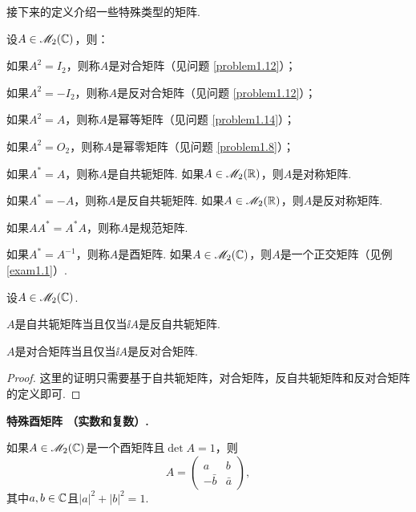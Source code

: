   接下来的定义介绍一些特殊类型的矩阵.
  \begin{definition}
    设$A\in\mathscr M_2(\mathbb C)$，则：
    \begin{enum}
      \item 如果$A^2=I_2$，则称$A$是{\kaishu 对合矩阵}（见问题 \ref{problem1.12}）；
      \item 如果$A^2=-I_2$，则称$A$是{\kaishu 反对合矩阵}（见问题 \ref{problem1.12}）；
      \item 如果$A^2=A$，则称$A$是{\kaishu 幂等矩阵}（见问题 \ref{problem1.14}）；
      \item 如果$A^2=O_2$，则称$A$是{\kaishu 幂零矩阵}（见问题 \ref{problem1.8}）；
      \item 如果$A^\ast=A$，则称$A$是{\kaishu 自共轭矩阵}. 如果$A\in\mathscr M_2(\mathbb R)$，则$A$是对称矩阵.
      \item 如果$A^\ast=-A$，则称$A$是{\kaishu 反自共轭矩阵}. 如果$A\in\mathscr M_2(\mathbb R)$，则$A$是反对称矩阵.
      \item 如果$AA^\ast=A^\ast A$，则称$A$是{\kaishu 规范矩阵}. 
      \item 如果$A^\ast=A^{-1}$，则称$A$是{\kaishu 酉矩阵}. 如果$A\in\mathscr M_2(\mathbb C)$，则$A$是一个正交矩阵（见例 \ref{exam1.1}）.
    \end{enum}
  \end{definition}

  \begin{lemma}
    设$A\in\mathscr M_2(\mathbb C)$.
    \begin{enum}
      \item $A$是自共轭矩阵当且仅当$\ii A$是反自共轭矩阵.
      \item $A$是对合矩阵当且仅当$\ii A$是反对合矩阵.
    \end{enum}
  \end{lemma}

  \begin{proof}
    这里的证明只需要基于自共轭矩阵，对合矩阵，反自共轭矩阵和反对合矩阵的定义即可.
  \end{proof}

  \begin{example}
    {\bfseries 特殊酉矩阵 \mbox{\hyds （}实数和复数\hyds）.}
    \begin{mybox}
      如果$A\in\mathscr M_2(\mathbb C)$是一个酉矩阵且$\det A=1$，则
      \[
        A = \begin{pmatrix}
          a & b \\
          -\bar b & \bar a
        \end{pmatrix},
      \]
      其中$a,b\in\mathbb C$且$|a|^2+|b|^2=1$.
    \end{mybox}
  \end{example}

